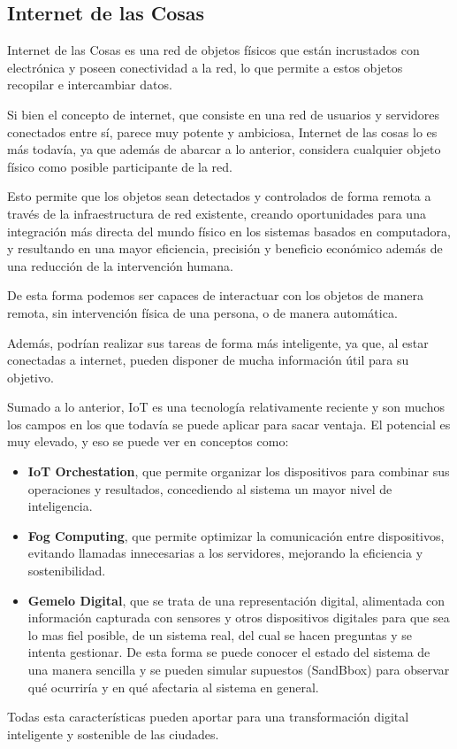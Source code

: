 \documentclass[12pt, a4paper, twoside]{article}
\begin{document}
\subsection{Internet de las Cosas}
Internet de las Cosas es una red de objetos físicos que están incrustados con electrónica y poseen 
conectividad a la red, lo que permite a estos objetos recopilar e intercambiar datos.

Si bien el concepto de internet, que consiste en una red de usuarios y servidores conectados entre sí,
parece muy potente y ambiciosa, Internet de las cosas lo es más todavía, ya que además de abarcar a 
lo anterior, considera cualquier objeto físico como posible participante de la red.

Esto permite que los objetos sean detectados y controlados de forma remota a través de la  infraestructura de red existente, 
creando oportunidades para una integración más directa del mundo físico en los sistemas basados 
en computadora, y resultando en una mayor eficiencia, precisión y beneficio económico además 
de una reducción de la intervención humana. 

De esta forma podemos ser capaces de interactuar con los objetos de manera remota, sin intervención física de
una persona, o de manera automática.

Además, podrían realizar sus tareas de forma más inteligente, ya que, al estar conectadas a internet, pueden
disponer de mucha información útil para su objetivo.

Sumado a lo anterior, IoT es una tecnología relativamente reciente y son muchos los campos en los que 
todavía se puede aplicar para sacar ventaja. El potencial es muy elevado, y eso se puede ver en
conceptos como:
\begin{itemize}
  \item \textbf{IoT Orchestation}, que permite organizar los dispositivos para combinar sus operaciones
  y resultados, concediendo al sistema un mayor nivel de inteligencia.
  \item \textbf{Fog Computing}, que permite optimizar la comunicación entre dispositivos, evitando llamadas
  innecesarias a los servidores, mejorando la eficiencia y sostenibilidad.
  \item \textbf{Gemelo Digital}, que se trata de una representación digital, alimentada con información
  capturada con sensores y otros dispositivos digitales para que sea lo mas fiel posible, de un
  sistema real, del cual se hacen preguntas y se intenta gestionar.
  De esta forma se puede conocer el estado del sistema de una manera sencilla y se pueden simular supuestos
  (SandBbox) para observar qué ocurriría y en qué afectaria al sistema en general.
\end{itemize}
Todas esta características pueden aportar para una transformación digital inteligente y sostenible de las ciudades.
\end{document}
